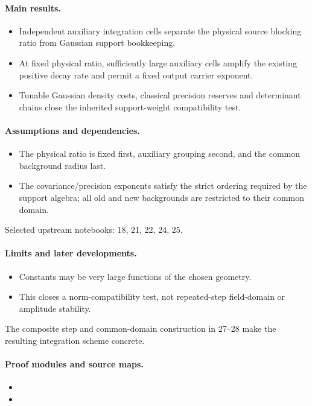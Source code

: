 \documentclass[11pt]{article}
\theoremstyle{remark}
\begin{document}
\paragraph{Main results.}
\begin{itemize}
\item Independent auxiliary integration cells separate the physical source blocking ratio from Gaussian support bookkeeping.
\item At fixed physical ratio, sufficiently large auxiliary cells amplify the existing positive decay rate and permit a fixed output carrier exponent.
\item Tunable Gaussian density costs, classical precision reserves and determinant chains close the inherited support-weight compatibility test.
\end{itemize}

\paragraph{Assumptions and dependencies.}
\begin{itemize}
\item The physical ratio is fixed first, auxiliary grouping second, and the common background radius last.
\item The covariance/precision exponents satisfy the strict ordering required by the support algebra; all old and new backgrounds are restricted to their common domain.
\end{itemize}

Selected upstream notebooks: 18, 21, 22, 24, 25.\par

\paragraph{Limits and later developments.}
\begin{itemize}
\item Constants may be very large functions of the chosen geometry.
\item This closes a norm-compatibility test, not repeated-step field-domain or amplitude stability.
\end{itemize}

The composite step and common-domain construction in 27--28 make the resulting integration scheme concrete.

\paragraph{Proof modules and source maps.}
\begingroup\small
\begin{itemize}
\item {}
\item {}
\end{itemize}
\endgroup
\end{document}
